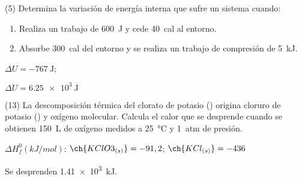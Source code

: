 \documentclass[10pt]{article}
\newenvironment{gexdatos}{
  \noindent\makebox[0pt][r]{\textit{Datos:}}
  }{\vspace{5pt}}
\begin{document}
\begin{multicols}{2}






\begin{exercise}[
    tags    = {},
    topics  = {química,química básica},
    source  = {FQ 1B MGH 2016, p85, e26},
  ]

  (5) Determina la variación de energía interna que sufre un sistema
  cuando:
  \begin{enumerate}
    \item Realiza un trabajo de \SI{600}{\joule} y cede \SI{40}{cal} al entorno.
    \item Absorbe \SI{300}{cal} del entorno y se realiza un trabajo de compresión de \SI{5}{\kilo\joule}.
  \end{enumerate}
\end{exercise}

\begin{solution}
  \begin{enumerate*}
    \item \( \Delta U = \SI{-767}{\joule} \); \item \( \Delta U = \SI{6.25e3}{\joule} \)
  \end{enumerate*}
\end{solution}




\begin{exercise}[
    tags    = {},
    topics  = {química,química básica},
    source  = {FQ 1B MGH 2016, p85, e26},
  ]

  (13) La descomposición térmica del clorato de potasio ()
  origina cloruro de potasio () y oxígeno molecular. Calcula
  el calor que se desprende cuando se obtienen \SI{150}{\liter} de
  oxígeno medidos a \SI{25}{\celsius} y \SI{1}{atm} de presión.

  \begin{gexdatos}
    \( \Delta H^0_f (\si{kJ/mol}) \): \( \ch{KClO3_{(s)}} = -91,2 \); \( \ch{KCl_{(s)}} = -436 \)
  \end{gexdatos}
\end{exercise}

\begin{solution}
  Se desprenden \SI{1.41e3}{kJ}.
\end{solution}




\begin{exercise}[
    tags    = {},
    topics  = {química,química básica},
    source  = {FQ 1B MGH 2016, p85, e26},
  ]


\end{exercise}
\end{multicols}
\end{document}

